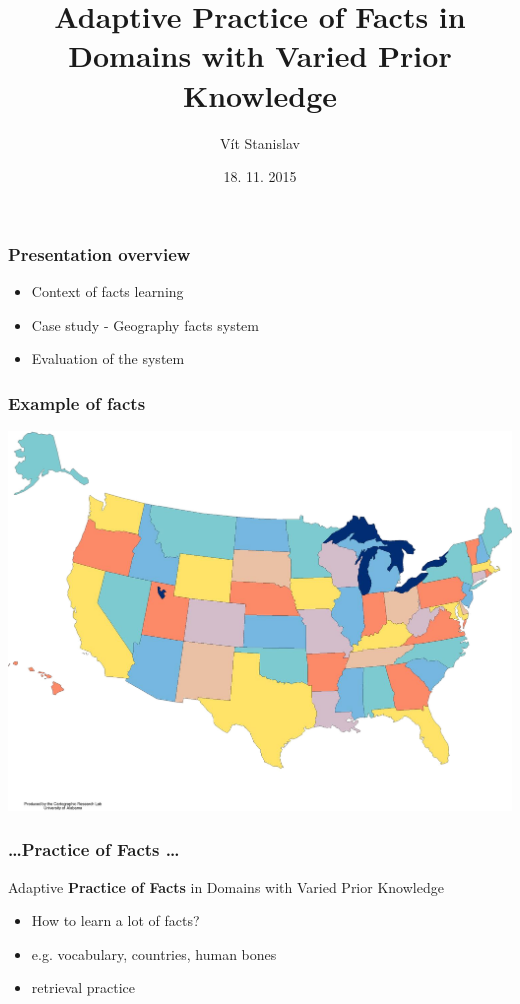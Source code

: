 \documentclass[xcolor=svgnames]{beamer}
\title[Adaptive Practice of Facts with Varied Prior Knowledge]{Adaptive Practice of Facts in Domains with Varied Prior Knowledge}
\author{Vít Stanislav}
\institute{}      %
\date{18. 11. 2015}
\begin{document}
\frame[plain]{\titlepage}
\begin{frame}
	\frametitle{Presentation overview}
	\begin{itemize}
    \item Context of facts learning
    \item Case study - Geography facts system
    \item Evaluation of the system
    \
	\end{itemize}
\end{frame}
\begin{frame}
	\frametitle{Example of facts}
   \includegraphics[width=\textwidth]{img/usa.png}
\end{frame}
\begin{frame}
	\frametitle{\ldots Practice of Facts \ldots}
   Adaptive \textbf{Practice of Facts} in Domains with Varied Prior Knowledge
	\begin{itemize}
    \item How to learn a lot of facts?
    \item e.g. vocabulary, countries, human bones
	  \item retrieval practice
    \
	\end{itemize}
\end{frame}
\end{document}
